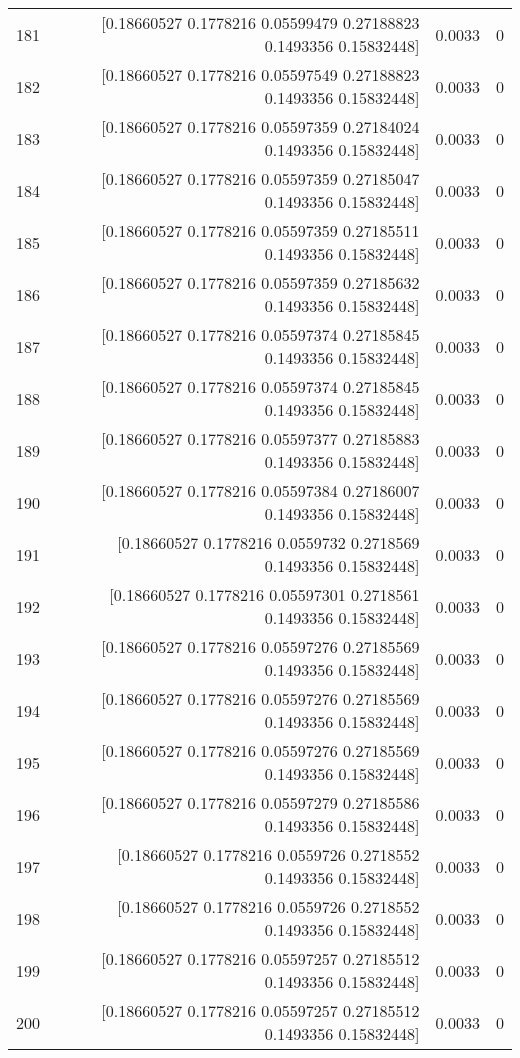 \begin{longtable}{lrrr}
181 & [0.18660527 0.1778216  0.05599479 0.27188823 0.1493356  0.15832448] & 0.0033 & 0 \\
182 & [0.18660527 0.1778216  0.05597549 0.27188823 0.1493356  0.15832448] & 0.0033 & 0 \\
183 & [0.18660527 0.1778216  0.05597359 0.27184024 0.1493356  0.15832448] & 0.0033 & 0 \\
184 & [0.18660527 0.1778216  0.05597359 0.27185047 0.1493356  0.15832448] & 0.0033 & 0 \\
185 & [0.18660527 0.1778216  0.05597359 0.27185511 0.1493356  0.15832448] & 0.0033 & 0 \\
186 & [0.18660527 0.1778216  0.05597359 0.27185632 0.1493356  0.15832448] & 0.0033 & 0 \\
187 & [0.18660527 0.1778216  0.05597374 0.27185845 0.1493356  0.15832448] & 0.0033 & 0 \\
188 & [0.18660527 0.1778216  0.05597374 0.27185845 0.1493356  0.15832448] & 0.0033 & 0 \\
189 & [0.18660527 0.1778216  0.05597377 0.27185883 0.1493356  0.15832448] & 0.0033 & 0 \\
190 & [0.18660527 0.1778216  0.05597384 0.27186007 0.1493356  0.15832448] & 0.0033 & 0 \\
191 & [0.18660527 0.1778216  0.0559732  0.2718569  0.1493356  0.15832448] & 0.0033 & 0 \\
192 & [0.18660527 0.1778216  0.05597301 0.2718561  0.1493356  0.15832448] & 0.0033 & 0 \\
193 & [0.18660527 0.1778216  0.05597276 0.27185569 0.1493356  0.15832448] & 0.0033 & 0 \\
194 & [0.18660527 0.1778216  0.05597276 0.27185569 0.1493356  0.15832448] & 0.0033 & 0 \\
195 & [0.18660527 0.1778216  0.05597276 0.27185569 0.1493356  0.15832448] & 0.0033 & 0 \\
196 & [0.18660527 0.1778216  0.05597279 0.27185586 0.1493356  0.15832448] & 0.0033 & 0 \\
197 & [0.18660527 0.1778216  0.0559726  0.2718552  0.1493356  0.15832448] & 0.0033 & 0 \\
198 & [0.18660527 0.1778216  0.0559726  0.2718552  0.1493356  0.15832448] & 0.0033 & 0 \\
199 & [0.18660527 0.1778216  0.05597257 0.27185512 0.1493356  0.15832448] & 0.0033 & 0 \\
200 & [0.18660527 0.1778216  0.05597257 0.27185512 0.1493356  0.15832448] & 0.0033 & 0 \\

\end{longtable}
